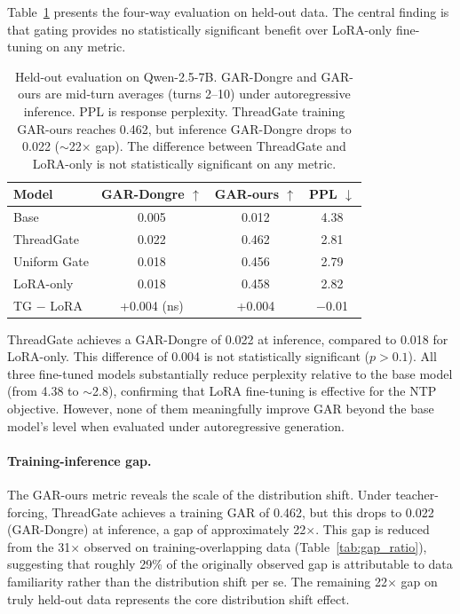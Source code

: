 \documentclass[11pt,a4paper]{article}
\begin{document}
Table~\ref{tab:main_results} presents the four-way evaluation on held-out data. The central finding is that gating provides no statistically significant benefit over LoRA-only fine-tuning on any metric.

\begin{table}[t]
\centering
\caption{Held-out evaluation on Qwen-2.5-7B. GAR-Dongre and GAR-ours are mid-turn averages (turns 2--10) under autoregressive inference. PPL is response perplexity. ThreadGate training GAR-ours reaches 0.462, but inference GAR-Dongre drops to 0.022 ($\sim$22$\times$ gap). The difference between ThreadGate and LoRA-only is not statistically significant on any metric.}
\label{tab:main_results}
\small
\begin{tabular}{lccc}
\toprule
\textbf{Model} & \textbf{GAR-Dongre} $\uparrow$ & \textbf{GAR-ours} $\uparrow$ & \textbf{PPL} $\downarrow$ \\
\midrule
Base & 0.005 & 0.012 & 4.38 \\
ThreadGate & 0.022 & 0.462 & 2.81 \\
Uniform Gate & 0.018 & 0.456 & 2.79 \\
LoRA-only & 0.018 & 0.458 & 2.82 \\
\midrule
TG $-$ LoRA & +0.004 (ns) & +0.004 & $-$0.01 \\
\bottomrule
\end{tabular}
\end{table}

ThreadGate achieves a GAR-Dongre of 0.022 at inference, compared to 0.018 for LoRA-only. This difference of 0.004 is not statistically significant ($p > 0.1$). All three fine-tuned models substantially reduce perplexity relative to the base model (from 4.38 to $\sim$2.8), confirming that LoRA fine-tuning is effective for the NTP objective. However, none of them meaningfully improve GAR beyond the base model's level when evaluated under autoregressive generation.

\paragraph{Training-inference gap.} The GAR-ours metric reveals the scale of the distribution shift. Under teacher-forcing, ThreadGate achieves a training GAR of 0.462, but this drops to 0.022 (GAR-Dongre) at inference, a gap of approximately 22$\times$. This gap is reduced from the 31$\times$ observed on training-overlapping data (Table~\ref{tab:gap_ratio}), suggesting that roughly 29\% of the originally observed gap is attributable to data familiarity rather than the distribution shift per se. The remaining 22$\times$ gap on truly held-out data represents the core distribution shift effect.
\end{document}

